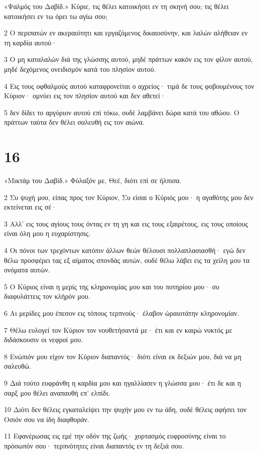 \par «Ψαλμός του Δαβίδ.» Κύριε, τις θέλει κατοικήσει εν τη σκηνή σου; τις θέλει κατοικήσει εν τω όρει τω αγίω σου;
\par 2 Ο περιπατών εν ακεραιότητι και εργαζόμενος δικαιοσύνην, και λαλών αλήθειαν εν τη καρδία αυτού·
\par 3 Ο μη καταλαλών διά της γλώσσης αυτού, μηδέ πράττων κακόν εις τον φίλον αυτού, μηδέ δεχόμενος ονειδισμόν κατά του πλησίον αυτού.
\par 4 Εις τους οφθαλμούς αυτού καταφρονείται ο αχρείος· τιμά δε τους φοβουμένους τον Κύριον· ομνύει εις τον πλησίον αυτού και δεν αθετεί·
\par 5 δεν δίδει το αργύριον αυτού επί τόκω, ουδέ λαμβάνει δώρα κατά του αθώου. Ο πράττων ταύτα δεν θέλει σαλευθή εις τον αιώνα.

\chapter{16}

\par «Μικτάμ του Δαβίδ.» Φύλαξόν με, Θεέ, διότι επί σε ήλπισα.
\par 2 Συ ψυχή μου, είπας προς τον Κύριον, Συ είσαι ο Κύριός μου· η αγαθότης μου δεν εκτείνεται εις σέ·
\par 3 Αλλ' εις τους αγίους τους όντας εν τη γη και εις τους εξαιρέτους, εις τους οποίους είναι όλη μου η ευχαρίστησις.
\par 4 Οι πόνοι των τρεχόντων κατόπιν άλλων θεών θέλουσι πολλαπλασιασθή· εγώ δεν θέλω προσφέρει τας εξ αίματος σπονδάς αυτών, ουδέ θέλω λάβει εις τα χείλη μου τα ονόματα αυτών.
\par 5 Ο Κύριος είναι η μερίς της κληρονομίας μου και του ποτηρίου μου· συ διαφυλάττεις τον κλήρόν μου.
\par 6 Αι μερίδες μου έπεσον εις τόπους τερπνούς· έλαβον ώραιοτάτην κληρονομίαν.
\par 7 Θέλω ευλογεί τον Κύριον τον νουθετήσαντά με· έτι και εν καιρώ νυκτός με διδάσκουσιν οι νεφροί μου.
\par 8 Ενώπιόν μου είχον τον Κύριον διαπαντός· διότι είναι εκ δεξιών μου, διά να μη σαλευθώ.
\par 9 Διά τούτο ευφράνθη η καρδία μου και ηγαλλίασεν η γλώσσα μου· έτι δε και η σαρξ μου θέλει αναπαυθή επ' ελπίδι.
\par 10 Διότι δεν θέλεις εγκαταλείψει την ψυχήν μου εν τω άδη, ουδέ θέλεις αφήσει τον Οσιόν σου να ίδη διαφθοράν.
\par 11 Εφανέρωσας εις εμέ την οδόν της ζωής· χορτασμός ευφροσύνης είναι το πρόσωπόν σου· τερπνότητες είναι διαπαντός εν τη δεξιά σου.

